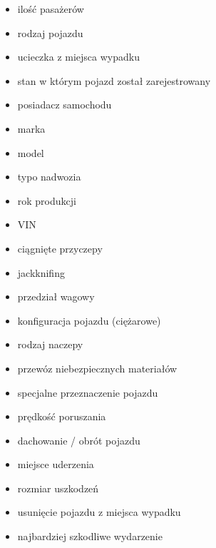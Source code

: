 \begin{itemize}
\itemsep-14pt\parskip0pt
\item
  ilość pasażerów\\
\item
  rodzaj pojazdu\\
\item
  ucieczka z miejsca wypadku\\
\item
  stan w którym pojazd został zarejestrowany\\
\item
  posiadacz samochodu\\
\item
  marka\\
\item
  model\\
\item
  typo nadwozia\\
\item
  rok produkcji\\
\item
  VIN\\
\item
  ciągnięte przyczepy\\
\item
  jackknifing\\
\item
  przedział wagowy\\
\item
  konfiguracja pojazdu (ciężarowe)\\
\item
  rodzaj naczepy\\
\item
  przewóz niebezpiecznych materiałów\\
\item
  specjalne przeznaczenie pojazdu\\
\item
  prędkość poruszania\\
\item
  dachowanie / obrót pojazdu\\
\item
  miejsce uderzenia\\
\item
  rozmiar uszkodzeń\\
\item
  usunięcie pojazdu z miejsca wypadku\\
\item
  najbardziej szkodliwe wydarzenie\\

\end{itemize}
